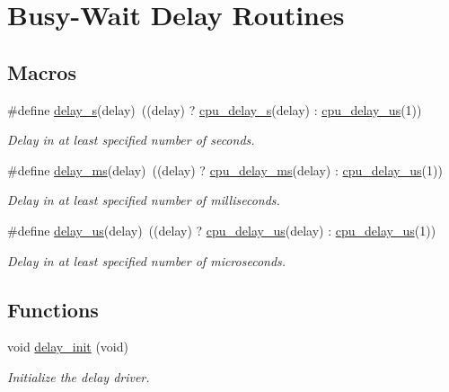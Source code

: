 \hypertarget{group__group__common__services__delay}{}\section{Busy-\/\+Wait Delay Routines}
\label{group__group__common__services__delay}
\subsection*{Macros}
\begin{DoxyCompactItemize}
\item 
\#define \mbox{\hyperlink{group__group__common__services__delay_gafdccadc6c16847907b3252cdef83e8b0}{delay\+\_\+s}}(delay)~((delay) ? \mbox{\hyperlink{systick__counter_8h_ac16436855dffc7dc7939324a0408adb0}{cpu\+\_\+delay\+\_\+s}}(delay) \+: \mbox{\hyperlink{systick__counter_8h_a25de6f000bcc542a5f3292e369e49681}{cpu\+\_\+delay\+\_\+us}}(1))
\begin{DoxyCompactList}\small\item\em Delay in at least specified number of seconds. \end{DoxyCompactList}\item 
\#define \mbox{\hyperlink{group__group__common__services__delay_gad917a5d772ddbd99ad97a1c999ce40d4}{delay\+\_\+ms}}(delay)~((delay) ? \mbox{\hyperlink{systick__counter_8h_acdbe5e2991f2b665ef2babea7b978667}{cpu\+\_\+delay\+\_\+ms}}(delay) \+: \mbox{\hyperlink{systick__counter_8h_a25de6f000bcc542a5f3292e369e49681}{cpu\+\_\+delay\+\_\+us}}(1))
\begin{DoxyCompactList}\small\item\em Delay in at least specified number of milliseconds. \end{DoxyCompactList}\item 
\#define \mbox{\hyperlink{group__group__common__services__delay_gaf9a0c0e0f880d818a4c2c3ea9fe8cba1}{delay\+\_\+us}}(delay)~((delay) ? \mbox{\hyperlink{systick__counter_8h_a25de6f000bcc542a5f3292e369e49681}{cpu\+\_\+delay\+\_\+us}}(delay) \+: \mbox{\hyperlink{systick__counter_8h_a25de6f000bcc542a5f3292e369e49681}{cpu\+\_\+delay\+\_\+us}}(1))
\begin{DoxyCompactList}\small\item\em Delay in at least specified number of microseconds. \end{DoxyCompactList}\end{DoxyCompactItemize}
\subsection*{Functions}
\begin{DoxyCompactItemize}
\item 
void \mbox{\hyperlink{group__group__common__services__delay_gaf3c040fe31e69be32855715a75e0cda4}{delay\+\_\+init}} (void)
\begin{DoxyCompactList}\small\item\em Initialize the delay driver. \end{DoxyCompactList}\end{DoxyCompactItemize}


